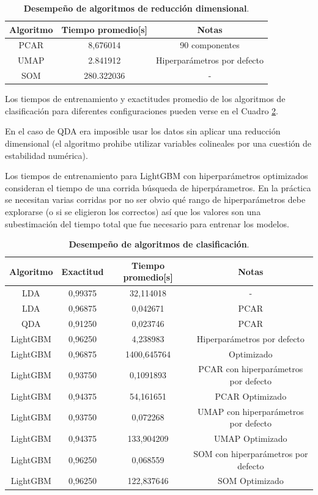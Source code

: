 \documentclass[12pt]{article}
\begin{document}
\begin{table}[htbp]
\centering
\begin{tabular}{|c|c|c|}
\hline
Algoritmo                        & Tiempo promedio[s] & Notas \\ \hline
PCAR                      & 8,676014 & 90 componentes      \\ \hline
UMAP                       & 2.841912 & Hiperparámetros por defecto \\ \hline
SOM                       & 280.322036 & -      \\ \hline
\end{tabular}
\caption{\textbf{Desempeño de algoritmos de reducción dimensional}.}
\label{table:dimensional_reduction}
\end{table}

Los tiempos de entrenamiento y exactitudes promedio de los algoritmos de clasificación para diferentes configuraciones pueden verse en el Cuadro \ref{table:classifier}. 

En el caso de QDA era imposible usar los datos sin aplicar una reducción dimensional (el algoritmo prohibe utilizar variables colineales por una cuestión de estabilidad numérica). 

Los tiempos de entrenamiento para LightGBM con hiperparámetros optimizados consideran el tiempo de una corrida búsqueda de hiperpárametros. En la práctica se necesitan varias corridas por no ser obvio qué rango de hiperparámetros debe explorarse (o si se eligieron los correctos) así que los valores son una subestimación del tiempo total que fue necesario para entrenar los modelos.

\begin{table}[htbp]
\centering
\begin{tabular}{|c|c|c|c|}
\hline
Algoritmo  & Exactitud & Tiempo promedio[s] & Notas \\ \hline
LDA      & 0,99375   & 32,114018     & - \\ \hline
LDA      & 0,96875   & 0,042671     & PCAR \\ \hline
QDA      & 0,91250   & 0,023746     & PCAR \\ \hline
LightGBM & 0,96250   & 4,238983     & Hiperparámetros por defecto \\ \hline
LightGBM & 0,96875   & 1400,645764  & Optimizado \\ \hline
LightGBM & 0,93750   & 0,1091893     & PCAR con hiperparámetros por defecto \\ \hline
LightGBM & 0,94375   & 54,161651  & PCAR Optimizado \\ \hline
LightGBM & 0,93750   & 0,072268     & UMAP con hiperparámetros por defecto \\ \hline
LightGBM & 0,94375   & 133,904209  & UMAP Optimizado \\ \hline
LightGBM & 0,96250   & 0,068559     & SOM con hiperparámetros por defecto \\ \hline
LightGBM & 0,96250   & 122,837646  & SOM Optimizado \\ \hline

\end{tabular}
\caption{\textbf{Desempeño de algoritmos de clasificación}.}
\label{table:classifier}
\end{table}
\end{document}
